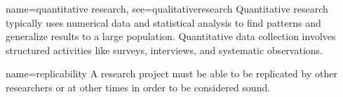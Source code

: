 {name={quantitative research},
	see={qualitativeresearch}}
{%
	Quantitative research typically uses numerical data and statistical
	analysis to find patterns and generalize results to a large population.
	Quantitative data collection involves structured activities like surveys,
	interviews, and systematic observations.
}

	{name={replicability}}
	{%
		A research project must be able to be replicated by other researchers or at other times in order to be considered sound.
	}

